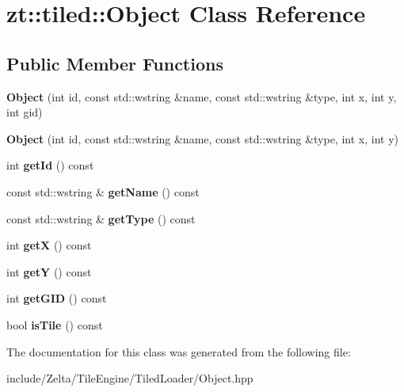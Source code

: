 \hypertarget{classzt_1_1tiled_1_1_object}{}\section{zt\+:\+:tiled\+:\+:Object Class Reference}
\label{classzt_1_1tiled_1_1_object}
\subsection*{Public Member Functions}
\begin{DoxyCompactItemize}
\item 
\mbox{\label{classzt_1_1tiled_1_1_object_a38cb0a9040104272f100723e19ee2d1f}} 
{\bfseries Object} (int id, const std\+::wstring \&name, const std\+::wstring \&type, int x, int y, int gid)
\item 
\mbox{\label{classzt_1_1tiled_1_1_object_a4463f1634e0c0caf10ab1e8d2d7fea5f}} 
{\bfseries Object} (int id, const std\+::wstring \&name, const std\+::wstring \&type, int x, int y)
\item 
\mbox{\label{classzt_1_1tiled_1_1_object_ad4edde1dde628b11a563361c4f27d85c}} 
int {\bfseries get\+Id} () const
\item 
\mbox{\label{classzt_1_1tiled_1_1_object_a3e0a50131d3a736d618433bd2952db3d}} 
const std\+::wstring \& {\bfseries get\+Name} () const
\item 
\mbox{\label{classzt_1_1tiled_1_1_object_ad6507d7d2869bccc17a2f929cb1e5c08}} 
const std\+::wstring \& {\bfseries get\+Type} () const
\item 
\mbox{\label{classzt_1_1tiled_1_1_object_abd81c25aa43deb1aed520b290db126df}} 
int {\bfseries getX} () const
\item 
\mbox{\label{classzt_1_1tiled_1_1_object_a1eb3865ba23cd299101861583d692856}} 
int {\bfseries getY} () const
\item 
\mbox{\label{classzt_1_1tiled_1_1_object_a6cad5d27d93c4dc8b2c1779029f11cd1}} 
int {\bfseries get\+G\+ID} () const
\item 
\mbox{\label{classzt_1_1tiled_1_1_object_aa2d833f560921209b0a7c809c5abbcc4}} 
bool {\bfseries is\+Tile} () const
\end{DoxyCompactItemize}


The documentation for this class was generated from the following file\+:\begin{DoxyCompactItemize}
\item 
include/\+Zelta/\+Tile\+Engine/\+Tiled\+Loader/Object.\+hpp\end{DoxyCompactItemize}
